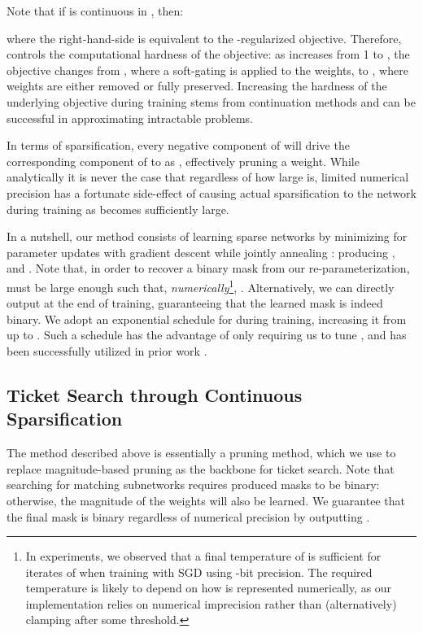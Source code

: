 \documentclass{article}
\newcommand{\method}{Continuous Sparsification}
\begin{document}
Note that if  is continuous in , then:

where the right-hand-side is equivalent to the -regularized objective. Therefore,  controls the computational hardness of the objective: as  increases from 1 to , the objective changes from , where a soft-gating  is applied to the weights, to , where weights are either removed or fully preserved. Increasing the hardness of the underlying objective during training stems from continuation methods \cite{contmethods} and can be successful in approximating intractable problems.

In terms of sparsification, every negative component of  will drive the corresponding component of  to  as , effectively pruning a weight. While analytically it is never the case that  regardless of how large  is, limited numerical precision has a fortunate side-effect of causing actual sparsification to the network during training as  becomes sufficiently large.

In a nutshell, our method consists of learning sparse networks by minimizing  for  parameter updates with gradient descent while jointly annealing : producing ,  and . Note that, in order to recover a binary mask  from our re-parameterization,  must be large enough such that, \emph{numerically}\footnote{In experiments, we observed that a final temperature of  is sufficient for iterates of  when training with SGD using -bit precision. The required temperature is likely to depend on how  is represented numerically, as our implementation relies on numerical imprecision rather than (alternatively) clamping after some threshold.}, . Alternatively, we can directly output  at the end of training, guaranteeing that the learned mask is indeed binary. We adopt an exponential schedule  for  during training, increasing it from  up to . Such a schedule has the advantage of only requiring us to tune , and has been successfully utilized in prior work \cite{gumbel}.

\subsection{Ticket Search through \method}

The method described above is essentially a pruning method, which we use to replace magnitude-based pruning as the backbone for ticket search. Note that searching for matching subnetworks requires produced masks to be binary: otherwise, the magnitude of the weights will also be learned. We guarantee that the final mask is binary regardless of numerical precision by outputting .
\end{document}
